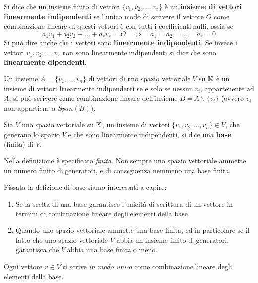 \begin{definition}
	Si dice che un insieme finito di vettori $\{v_1, v_2, ..., v_r\}$ è un \textbf{insieme di vettori
		linearmente indipendenti} se l'unico modo di scrivere il vettore $O$ come combinazione lineare di questi
	vettori è con tutti i coefficienti nulli, ossia se
	\[ a_1 v_1 + a_2 v_2 + ... + a_r v_r = O \quad \Leftrightarrow \quad a_1 = a_2 = ... = a_r = 0 \]
	Si può dire anche che i vettori sono \textbf{linearmente indipendenti}. Se invece i vettori
	$v_1, v_2, ..., v_r$ non sono linearmente indipendenti si dice che sono \textbf{linearmente dipendenti}.
\end{definition}

\begin{proposition}
	Un insieme $A = \{v_1, ..., v_n\}$ di vettori di uno spazio vettoriale $V$ su $\mathbb{K}$ è un insieme
	di vettori linearmente indipendenti se e solo se nessun $v_i$, appartenente ad $A$, si può scrivere come
	combinazione lineare dell'insieme $B = A \backslash \{v_i\}$ (ovvero $v_i$ non appartiene a $Span(B)$).
\end{proposition}

\begin{definition}
	Sia $V$ uno spazio vettoriale su $\mathbb{K}$, un insieme di vettori $\{v_1, v_2, ..., v_n\} \in V$, che
	generano lo spazio $V$ e che sono linearmente indipendenti, si dice una \textbf{base} (finita) di $V$.
\end{definition}

\begin{observation}
	Nella definizione è specificato \emph{finita}. Non sempre uno spazio vettoriale ammette un numero finito di
	generatori, e di conseguenza nemmeno una base finita.
\end{observation}

Fissata la defizione di base siamo interessati a capire:
\begin{enumerate}
	\item Se la scelta di una base garantisce l'unicità di scrittura di un vettore in termini di combinazione
	      lineare degli elementi della base.
	\item Quando uno spazio vettoriale ammette una base finita, ed in particolare se il fatto che uno spazio
	      vettoriale $V$ abbia un insieme finito di generatori, garantisca che $V$ abbia una base finita o meno.
\end{enumerate}

\begin{proposition}
	Ogni vettore $v \in V$ si scrive \emph{in modo unico} come combinazione lineare degli elementi della base.
\end{proposition}

